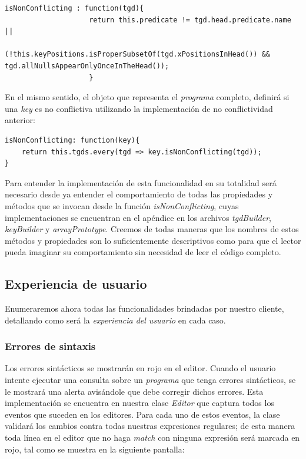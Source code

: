 \documentclass[11pt,a4paper,twoside]{tesis}
\begin{document}
\begin{lstlisting}[caption=Implementación de claves no conflictivas]
isNonConflicting : function(tgd){
					return this.predicate != tgd.head.predicate.name ||
						(!this.keyPositions.isProperSubsetOf(tgd.xPositionsInHead()) && tgd.allNullsAppearOnlyOnceInTheHead());
					}
\end{lstlisting}

En el mismo sentido, el objeto que representa el \textit{programa} completo, definirá si una \textit{key} es no conflictiva utilizando la implementación de no conflictividad anterior:

\begin{lstlisting}[caption=Implementación de claves no conflictivas]
isNonConflicting: function(key){
	return this.tgds.every(tgd => key.isNonConflicting(tgd));
}
\end{lstlisting}

Para entender la implementación de esta funcionalidad en su totalidad será necesario desde ya entender el comportamiento de todas las propiedades y métodos que se invocan desde la función \textit{isNonConflicting}, cuyas implementaciones se encuentran en el apéndice en los archivos \textit{tgdBuilder}, \textit{keyBuilder} y \textit{arrayPrototype}. Creemos de todas maneras que los nombres de estos métodos y propiedades son lo suficientemente descriptivos como para que el lector pueda imaginar su comportamiento sin necesidad de leer el código completo.

\subsection{Experiencia de usuario}

Enumeraremos ahora todas las funcionalidades brindadas por nuestro cliente, detallando como será la \textit{experiencia del usuario} en cada caso.

\subsubsection{Errores de sintaxis}
Los errores sintácticos se mostrarán en rojo en el editor. Cuando el usuario intente ejecutar una consulta sobre un \textit{programa} que tenga errores sintácticos, se le mostrará una alerta avisándole que debe corregir dichos errores. Esta implementación se encuentra en nuestra clase \textit{Editor} que captura todos los eventos que suceden en los editores. Para cada uno de estos eventos, la clase validará los cambios contra todas nuestras expresiones regulares; de esta manera toda línea en el editor que no haga \textit{match} con ninguna expresión será marcada en rojo, tal como se muestra en la siguiente pantalla: 
\end{document}
